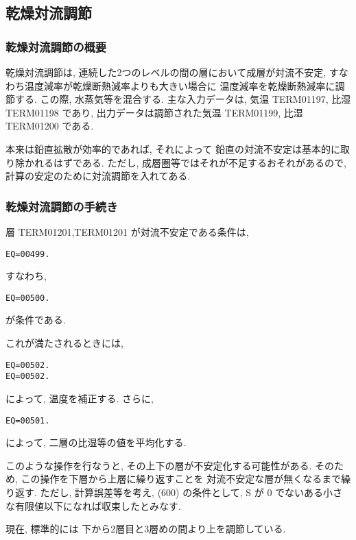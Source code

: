 ﻿
\subsection{乾燥対流調節}

\subsubsection{乾燥対流調節の概要}

乾燥対流調節は, 
連続した2つのレベルの間の層において成層が対流不安定, 
すなわち温度減率が乾燥断熱減率よりも大きい場合に
温度減率を乾燥断熱減率に調節する. この際, 水蒸気等を混合する.
主な入力データは, 気温 TERM01197, 比湿 TERM01198 であり,
出力データは調節された気温 TERM01199, 比湿 TERM01200 である.

本来は鉛直拡散が効率的であれば, それによって
鉛直の対流不安定は基本的に取り除かれるはずである.
ただし, 成層圏等ではそれが不足するおそれがあるので,
計算の安定のために対流調節を入れてある.

\subsubsection{乾燥対流調節の手続き}

層 TERM01201,TERM01201 が対流不安定である条件は,
%
\begin{verbatim}
EQ=00499.
\end{verbatim}
%
すなわち,
\begin{verbatim}
EQ=00500.
\end{verbatim}
が条件である.

これが満たされるときには,
\begin{verbatim}
EQ=00502.
EQ=00502.
\end{verbatim}
によって, 温度を補正する.
さらに,
\begin{verbatim}
EQ=00501.
\end{verbatim}
によって, 二層の比湿等の値を平均化する.

このような操作を行なうと,
その上下の層が不安定化する可能性がある. そのため,
この操作を下層から上層に繰り返すことを
対流不安定な層が無くなるまで繰り返す.
ただし, 計算誤差等を考え, 
(600) の条件として,
S が 0 でないある小さな有限値以下になれば収束したとみなす.

現在, 標準的には 下から2層目と3層めの間より上を調節している.

